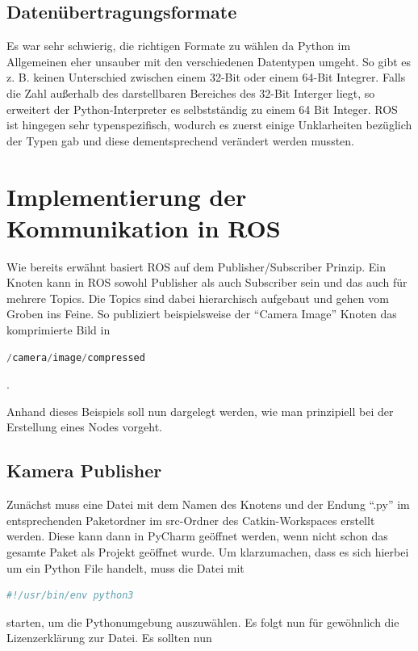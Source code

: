 \subsection{Datenübertragungsformate}
Es war sehr schwierig, die richtigen Formate zu wählen da Python im Allgemeinen eher unsauber mit den verschiedenen Datentypen umgeht. So gibt es z. B. keinen Unterschied zwischen einem 32-Bit oder einem 64-Bit Integrer. Falls die Zahl außerhalb des darstellbaren Bereiches des 32-Bit Interger liegt, so erweitert der Python-Interpreter es selbstständig zu einem 64 Bit Integer. ROS ist hingegen sehr typenspezifisch, wodurch es zuerst einige Unklarheiten bezüglich der Typen gab und diese dementsprechend verändert werden mussten.\\


\section{Implementierung der Kommunikation in ROS}
Wie bereits erwähnt basiert ROS auf dem Publisher/Subscriber Prinzip. Ein Knoten kann in ROS sowohl Publisher als auch Subscriber sein und das auch für mehrere Topics. Die Topics sind dabei hierarchisch aufgebaut und gehen vom Groben ins Feine. So publiziert beispielsweise der ``Camera Image'' Knoten das komprimierte Bild in 

\begin{lstlisting}[language=Python]
/camera/image/compressed
\end{lstlisting}. 

Anhand dieses Beispiels soll nun dargelegt werden, wie man prinzipiell bei der Erstellung eines Nodes vorgeht.


\subsection{Kamera Publisher}
Zunächst muss eine Datei mit dem Namen des Knotens und der Endung ``.py'' im entsprechenden Paketordner im src-Ordner des Catkin-Workspaces erstellt werden. Diese kann dann in PyCharm geöffnet werden, wenn nicht schon das gesamte Paket als Projekt geöffnet wurde.
Um klarzumachen, dass es sich hierbei um ein Python File handelt, muss die Datei mit 


\begin{lstlisting}[language=Python]
#!/usr/bin/env python3
\end{lstlisting}

starten, um die Pythonumgebung auszuwählen. Es folgt nun für gewöhnlich die Lizenzerklärung zur Datei. Es sollten nun 

